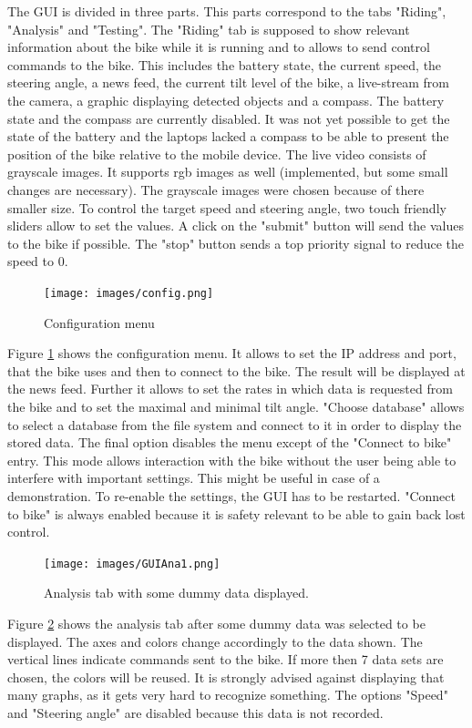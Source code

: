 \documentclass[]{scrreprt}
\begin{document}
	The GUI is divided in three parts. This parts correspond to the tabs "Riding", "Analysis" and "Testing". The "Riding" tab is supposed to show relevant information about the bike while it is running and to allows to send control commands to the bike. This includes the battery state, the current speed, the steering angle, a news feed, the current tilt level of the bike, a live-stream from the camera, a graphic displaying detected objects and a compass. The battery state and the compass are currently disabled. It was not yet possible to get the state of the battery and the laptops lacked a compass to be able to present the position of the bike relative to the mobile device. The live video consists of grayscale images. It supports rgb images as well (implemented, but some small changes are necessary). The grayscale images were chosen because of there smaller size.
	To control the target speed and steering angle, two touch friendly sliders allow to set the values. A click on the "submit" button will send the values to the bike if possible. The "stop" button sends a top priority signal to reduce the speed to 0. 
	\begin{figure}
		\centering
		\texttt{[image: images/config.png]}
		\caption{Configuration menu} \label{fig:config}
	\end{figure}
	Figure \ref{fig:config} shows the configuration menu. It allows to set the IP address and port, that the bike uses and then to connect to the bike. The result will be displayed at the news feed. Further it allows to set the rates in which data is requested from the bike and to set the maximal and minimal tilt angle. "Choose database" allows to select a database from the file system and connect to it in order to display the stored data. The final option disables the menu except of the "Connect to bike" entry. This mode allows interaction with the bike without the user being able to interfere with important settings. This might be useful in case of a demonstration. To re-enable the settings, the GUI has to be restarted. "Connect to bike" is always enabled because it is safety relevant to be able to gain back lost control.
	
	\begin{figure}[h]
		\centering
		\texttt{[image: images/GUIAna1.png]}
		\caption[Analysis tab]{Analysis tab with some dummy data displayed.}
		\label{fig:AnaTab1}
	\end{figure}

	Figure \ref{fig:AnaTab1} shows the analysis tab after some dummy data was selected to be displayed. The axes and colors change accordingly to the data shown. The vertical lines indicate commands sent to the bike. If more then 7 data sets are chosen, the colors will be reused. It is strongly advised against displaying that many graphs, as it gets very hard to recognize something. The options "Speed" and "Steering angle" are disabled because this data is not recorded.\\
	
\end{document}
